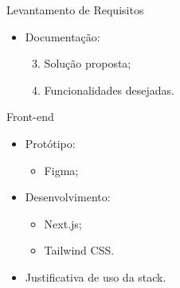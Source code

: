 \begin{frame}{Levantamento de Requisitos}
    \begin{itemize}
        \item Documentação: \vspace{0.5cm}
              \begin{enumerate}
                  \setcounter{enumi}{2}
                  \item Solução proposta; \vspace{0.5cm}
                  \item Funcionalidades desejadas. \vspace{0.5cm}
              \end{enumerate}
    \end{itemize}
\end{frame}

\begin{frame}{Front-end}
    \begin{itemize}
        \item Protótipo: \vspace{0.5cm}
              \begin{itemize}
                  \item Figma; \vspace{0.5cm}
              \end{itemize}
        \item Desenvolvimento: \vspace{0.5cm}
              \begin{itemize}
                  \item Next.js; \vspace{0.5cm}
                  \item Tailwind CSS. \vspace{0.5cm}
              \end{itemize}
        \item Justificativa de uso da stack. \vspace{0.5cm}
    \end{itemize}
\end{frame}

